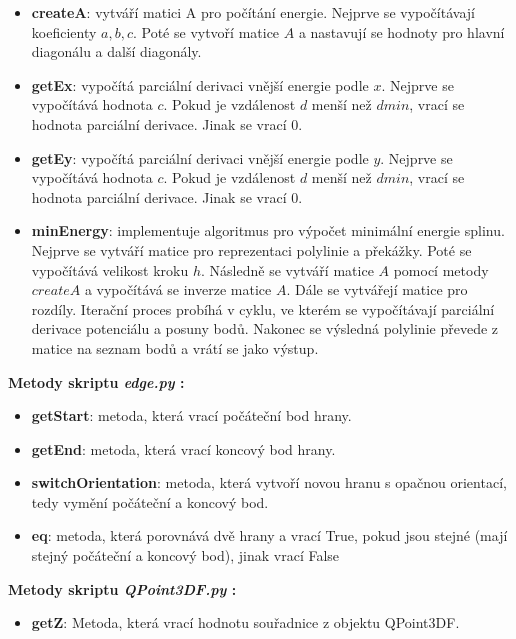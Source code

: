 \documentclass[a4paper,12pt]{article}
\begin{document}
{{{{{{\begin{itemize}
        \item \textbf{createA}: vytváří matici A pro počítání energie. Nejprve se vypočítávají koeficienty $a, b, c$. Poté se vytvoří matice $A$ a nastavují se hodnoty pro hlavní diagonálu a další diagonály.

        \item \textbf{getEx}: vypočítá parciální derivaci vnější energie podle $x$. Nejprve se vypočítává hodnota $c$. Pokud je vzdálenost $d$ menší než $dmin$, vrací se hodnota parciální derivace. Jinak se vrací 0.

        \item \textbf{getEy}: vypočítá parciální derivaci vnější energie podle $y$. Nejprve se vypočítává hodnota $c$. Pokud je vzdálenost $d$ menší než $dmin$, vrací se hodnota parciální derivace. Jinak se vrací 0.

        \item \textbf{minEnergy}:  implementuje algoritmus pro výpočet minimální energie splinu. Nejprve se vytváří matice pro reprezentaci polylinie a překážky. Poté se vypočítává velikost kroku $h$. Následně se vytváří matice $A$ pomocí metody $createA$ a vypočítává se inverze matice $A$. Dále se vytvářejí matice pro rozdíly. Iterační proces probíhá v cyklu, ve kterém se vypočítávají parciální derivace potenciálu a posuny bodů. Nakonec se výsledná polylinie převede z matice na seznam bodů a vrátí se jako výstup.
        
    \end{itemize}

    \textbf{Metody skriptu \emph{edge.py} :}
    \begin{itemize}
    \item \textbf{getStart}: metoda, která vrací počáteční bod hrany.
    \item \textbf{getEnd}: metoda, která vrací koncový bod hrany.
    \item \textbf{switchOrientation}: metoda, která vytvoří novou hranu s opačnou orientací, tedy vymění počáteční a koncový bod.
    \item \textbf{eq}: metoda, která porovnává dvě hrany a vrací True, pokud jsou stejné (mají stejný počáteční a koncový bod), jinak vrací False
    \end{itemize}

    \textbf{Metody skriptu \emph{QPoint3DF.py} :}
    \begin{itemize}
    \item \textbf{getZ}: Metoda, která vrací hodnotu souřadnice z objektu QPoint3DF.
    \end{itemize}

}}}}}}
\end{document}
